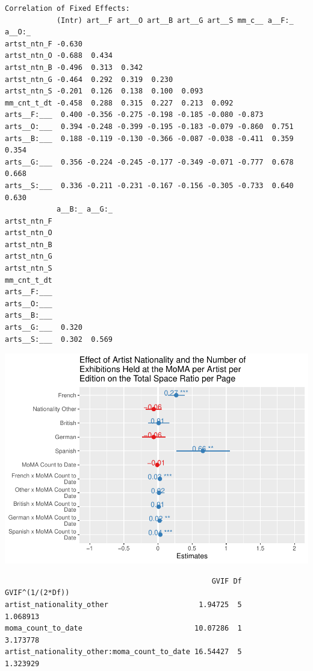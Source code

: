 \documentclass[
  letterpaper,
  DIV=11,
  numbers=noendperiod]{scrreprt}
\begin{document}
\begin{verbatim}
Correlation of Fixed Effects:
            (Intr) art__F art__O art__B art__G art__S mm_c__ a__F:_ a__O:_
artst_ntn_F -0.630                                                        
artst_ntn_O -0.688  0.434                                                 
artst_ntn_B -0.496  0.313  0.342                                          
artst_ntn_G -0.464  0.292  0.319  0.230                                   
artst_ntn_S -0.201  0.126  0.138  0.100  0.093                            
mm_cnt_t_dt -0.458  0.288  0.315  0.227  0.213  0.092                     
arts__F:___  0.400 -0.356 -0.275 -0.198 -0.185 -0.080 -0.873              
arts__O:___  0.394 -0.248 -0.399 -0.195 -0.183 -0.079 -0.860  0.751       
arts__B:___  0.188 -0.119 -0.130 -0.366 -0.087 -0.038 -0.411  0.359  0.354
arts__G:___  0.356 -0.224 -0.245 -0.177 -0.349 -0.071 -0.777  0.678  0.668
arts__S:___  0.336 -0.211 -0.231 -0.167 -0.156 -0.305 -0.733  0.640  0.630
            a__B:_ a__G:_
artst_ntn_F              
artst_ntn_O              
artst_ntn_B              
artst_ntn_G              
artst_ntn_S              
mm_cnt_t_dt              
arts__F:___              
arts__O:___              
arts__B:___              
arts__G:___  0.320       
arts__S:___  0.302  0.569
\end{verbatim}

\includegraphics{Chapter2/Chapter2_files/figure-pdf/sjplot-1.pdf}

\begin{verbatim}
                                                GVIF Df GVIF^(1/(2*Df))
artist_nationality_other                     1.94725  5        1.068913
moma_count_to_date                          10.07286  1        3.173778
artist_nationality_other:moma_count_to_date 16.54427  5        1.323929
\end{verbatim}
\end{document}
